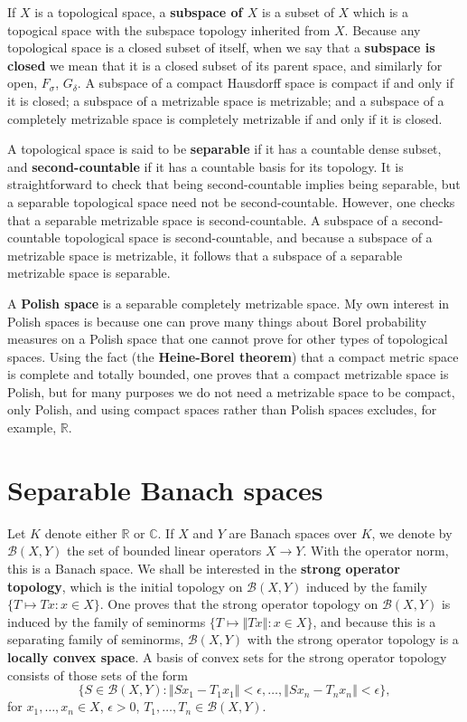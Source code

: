 \documentclass{article}
\newcommand{\norm}[1]{\left\Vert #1 \right\Vert}
\theoremstyle{definition}
\begin{document}
If $X$ is a topological space, a \textbf{subspace of $X$} is a subset of $X$ which is a topogical space with the subspace topology inherited from $X$. 
Because any topological space is a closed subset of itself, when we say that a \textbf{subspace is closed} we mean that 
it is a closed subset of its parent space, and similarly for open, $F_\sigma$, $G_\delta$.
A subspace of a compact Hausdorff space is compact if and only if it is closed;
a subspace of a metrizable space is metrizable; and a subspace of a completely metrizable space is completely metrizable if and only if it is closed.

A topological space is said to be \textbf{separable} if it has a countable dense subset, and \textbf{second-countable} if it has a countable basis for its topology.
It is straightforward to check that being second-countable implies being separable, but a separable topological space need not be second-countable. However, one checks
that a separable metrizable space is  second-countable. 
A subspace of a second-countable topological space is second-countable, and because a subspace of a metrizable space is metrizable, it follows that a subspace
of a separable metrizable space is separable.

A \textbf{Polish space} is a separable completely metrizable space. My own interest in Polish spaces is because one can prove many things about Borel
probability measures on a Polish space that one cannot prove for other types of topological spaces. Using the fact (the \textbf{Heine-Borel theorem}) that a compact
metric space is complete and totally bounded, one proves that a compact metrizable space is Polish, but for many
purposes we do not need  a metrizable space to be compact, only Polish, and using compact spaces rather than Polish spaces
excludes, for example, $\mathbb{R}$. 


\section{Separable Banach spaces}
Let $K$ denote either $\mathbb{R}$ or $\mathbb{C}$. 
If $X$ and $Y$ are Banach spaces over $K$, we denote by $\mathscr{B}(X,Y)$ the set of bounded linear operators $X \to Y$. With the operator norm, 
this is a Banach space.
We shall be interested in the \textbf{strong operator topology}, which is the initial topology on
$\mathscr{B}(X,Y)$ induced by the family $\{T \mapsto Tx: x \in X\}$. 
One proves that the strong operator topology on $\mathscr{B}(X,Y)$ is induced by the family of
seminorms $\{T \mapsto \norm{Tx}: x \in X\}$, and because this is a separating family of seminorms, $\mathscr{B}(X,Y)$ with the strong operator topology is
a \textbf{locally convex space}. 
A basis of convex sets for the strong operator topology consists of those sets of the form
\[
\{S \in \mathscr{B}(X,Y): \norm{Sx_1-T_1x_1}<\epsilon,\ldots,\norm{Sx_n-T_nx_n}<\epsilon\},
\]
for $x_1,\ldots,x_n \in X$, $\epsilon>0$, $T_1,\ldots,T_n \in \mathscr{B}(X,Y)$. 
 
\end{document}
